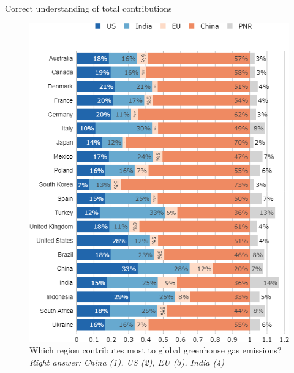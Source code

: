 	\begin{frame}{Correct understanding of total contributions}%
	\begin{figure}[h!]
	\centering
	\caption{Which region contributes most to global greenhouse gas emissions?
	\newline \footnotesize{\textit{Right answer: China (1), US (2), EU (3), India (4)}}} %
	\vspace{-0.2cm}
	\includegraphics[height=.8\paperheight]{../figures/country_comparison/footprint_region_countries_most.png} %
	\end{figure}
\end{frame}
	
